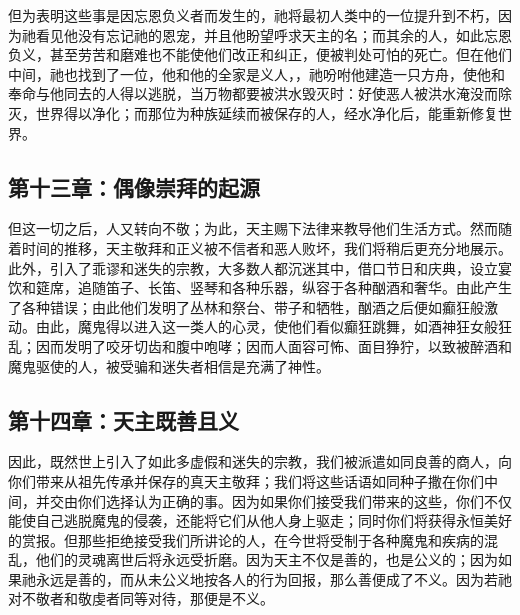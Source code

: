 但为表明这些事是因忘恩负义者而发生的，祂将最初人类中的一位提升到不朽，因为祂看见他没有忘记祂的恩宠，并且他盼望呼求天主的名；而其余的人，如此忘恩负义，甚至劳苦和磨难也不能使他们改正和纠正，便被判处可怕的死亡。但在他们中间，祂也找到了一位，他和他的全家是义人，，祂吩咐他建造一只方舟，使他和奉命与他同去的人得以逃脱，当万物都要被洪水毁灭时：好使恶人被洪水淹没而除灭，世界得以净化；而那位为种族延续而被保存的人，经水净化后，能重新修复世界。\par


\subsection{第十三章：偶像崇拜的起源}

但这一切之后，人又转向不敬；为此，天主赐下法律来教导他们生活方式。然而随着时间的推移，天主敬拜和正义被不信者和恶人败坏，我们将稍后更充分地展示。此外，引入了乖谬和迷失的宗教，大多数人都沉迷其中，借口节日和庆典，设立宴饮和筵席，追随笛子、长笛、竖琴和各种乐器，纵容于各种酗酒和奢华。由此产生了各种错误；由此他们发明了丛林和祭台、带子和牺牲，酗酒之后便如癫狂般激动。由此，魔鬼得以进入这一类人的心灵，使他们看似癫狂跳舞，如酒神狂女般狂乱；因而发明了咬牙切齿和腹中咆哮；因而人面容可怖、面目狰狞，以致被醉酒和魔鬼驱使的人，被受骗和迷失者相信是充满了神性。\par


\subsection{第十四章：天主既善且义}

因此，既然世上引入了如此多虚假和迷失的宗教，我们被派遣如同良善的商人，向你们带来从祖先传承并保存的真天主敬拜；我们将这些话语如同种子撒在你们中间，并交由你们选择认为正确的事。因为如果你们接受我们带来的这些，你们不仅能使自己逃脱魔鬼的侵袭，还能将它们从他人身上驱走；同时你们将获得永恒美好的赏报。但那些拒绝接受我们所讲论的人，在今世将受制于各种魔鬼和疾病的混乱，他们的灵魂离世后将永远受折磨。因为天主不仅是善的，也是公义的；因为如果祂永远是善的，而从未公义地按各人的行为回报，那么善便成了不义。因为若祂对不敬者和敬虔者同等对待，那便是不义。\par


